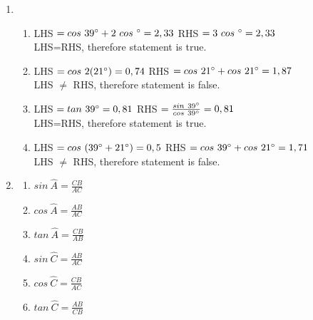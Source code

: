 \begin{solutions}{}
{\begin{enumerate}[itemsep=5pt, label=\textbf{\arabic*}. ]
\begin{multicols}{2}
\end{multicols}
\item %
\begin{enumerate}[noitemsep, label=\textbf{(\alph*)} ]
\item %
    LHS $= cos~39^{\circ} + 2~cos~^{\circ}\\
	 = 2,33 \\$
    RHS $= 3~cos~^{\circ}\\
	= 2,33$ \\
LHS=RHS, therefore statement is true.
\item %
    LHS $= cos~2(21^{\circ})\\
	 = 0,74 \\$
    RHS $= cos~21^{\circ}+cos~21^{\circ}\\
	= 1,87$ \\
LHS $\ne$ RHS, therefore statement is false.
\item %
    LHS $= tan~39^{\circ}\\
	 = 0,81 \\$
    RHS $= \frac{sin~39^{\circ}}{cos~39^{\circ}}\\
	= 0,81$ \\
LHS=RHS, therefore statement is true.
\item %
LHS $= cos~(39^{\circ}+21^{\circ})\\
	 = 0,5 \\$
    RHS $= cos~39^{\circ}+cos~21^{\circ}\\
	= 1,71$ \\
LHS $\ne$ RHS, therefore statement is false.
\end{enumerate}

\item %
\begin{multicols}{2}
\begin{enumerate}[itemsep=1pt, label=\textbf{(\alph*)} ]
\item $sin~\hat{A} = \frac{CB}{AC}$
\item $cos~\hat{A} = \frac{AB}{AC}$%
\item $tan~\hat{A} = \frac{CB}{AB}$%
\item $sin~\hat{C} = \frac{AB}{AC}$%
\item $cos~\hat{C} = \frac{CB}{AC}$%
\item $tan~\hat{C} = \frac{AB}{CB}$%
\end{enumerate}


\end{multicols}
\end{enumerate}}
\end{solutions}
